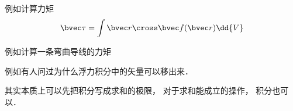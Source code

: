 
\begin{issues}
\issueDraft
\end{issues}

例如计算力矩
\begin{equation}
\bvec \tau = \int \bvec r \cross \bvec f(\bvec r) \dd{V}
\end{equation}

例如计算一条弯曲导线的力矩

例如有人问过为什么浮力积分中的矢量可以移出来．

其实本质上可以先把积分写成求和的极限， 对于求和能成立的操作， 积分也可以．
